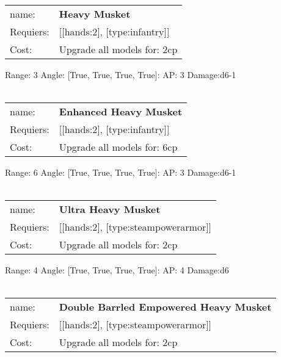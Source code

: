 \ \\
\begin{tabular}{ll}
name: & {\bf Heavy Musket } \\
Requiers: & [[hands:2], [type:infantry]] \\
Cost: & Upgrade all models for: 2cp \\
\end{tabular}



Range: 3  Angle: [True, True, True, True]: AP: 3 Damage:d6-1 \\








\ \\
\begin{tabular}{ll}
name: & {\bf Enhanced Heavy Musket } \\
Requiers: & [[hands:2], [type:infantry]] \\
Cost: & Upgrade all models for: 6cp \\
\end{tabular}



Range: 6  Angle: [True, True, True, True]: AP: 3 Damage:d6-1 \\








\ \\
\begin{tabular}{ll}
name: & {\bf Ultra Heavy Musket } \\
Requiers: & [[hands:2], [type:steampowerarmor]] \\
Cost: & Upgrade all models for: 2cp \\
\end{tabular}



Range: 4  Angle: [True, True, True, True]: AP: 4 Damage:d6 \\








\ \\
\begin{tabular}{ll}
name: & {\bf Double Barrled Empowered Heavy Musket } \\
Requiers: & [[hands:2], [type:steampowerarmor]] \\
Cost: & Upgrade all models for: 2cp \\
\end{tabular}



